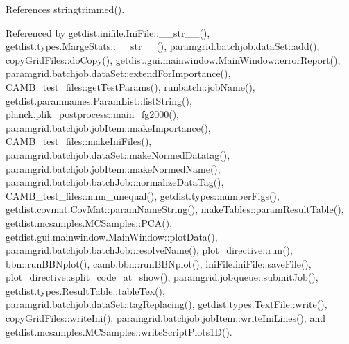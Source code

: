 References stringtrimmed().



Referenced by getdist.\+inifile.\+Ini\+File\+::\+\_\+\+\_\+str\+\_\+\+\_\+(), getdist.\+types.\+Marge\+Stats\+::\+\_\+\+\_\+str\+\_\+\+\_\+(), paramgrid.\+batchjob.\+data\+Set\+::add(), copy\+Grid\+Files\+::do\+Copy(), getdist.\+gui.\+mainwindow.\+Main\+Window\+::error\+Report(), paramgrid.\+batchjob.\+data\+Set\+::extend\+For\+Importance(), C\+A\+M\+B\+\_\+test\+\_\+files\+::get\+Test\+Params(), runbatch\+::job\+Name(), getdist.\+paramnames.\+Param\+List\+::list\+String(), planck.\+plik\+\_\+postprocess\+::main\+\_\+fg2000(), paramgrid.\+batchjob.\+job\+Item\+::make\+Importance(), C\+A\+M\+B\+\_\+test\+\_\+files\+::make\+Ini\+Files(), paramgrid.\+batchjob.\+data\+Set\+::make\+Normed\+Datatag(), paramgrid.\+batchjob.\+job\+Item\+::make\+Normed\+Name(), paramgrid.\+batchjob.\+batch\+Job\+::normalize\+Data\+Tag(), C\+A\+M\+B\+\_\+test\+\_\+files\+::num\+\_\+unequal(), getdist.\+types\+::number\+Figs(), getdist.\+covmat.\+Cov\+Mat\+::param\+Name\+String(), make\+Tables\+::param\+Result\+Table(), getdist.\+mcsamples.\+M\+C\+Samples\+::\+P\+C\+A(), getdist.\+gui.\+mainwindow.\+Main\+Window\+::plot\+Data(), paramgrid.\+batchjob.\+batch\+Job\+::resolve\+Name(), plot\+\_\+directive\+::run(), bbn\+::run\+B\+B\+Nplot(), camb.\+bbn\+::run\+B\+B\+Nplot(), ini\+File.\+ini\+File\+::save\+File(), plot\+\_\+directive\+::split\+\_\+code\+\_\+at\+\_\+show(), paramgrid.\+jobqueue\+::submit\+Job(), getdist.\+types.\+Result\+Table\+::table\+Tex(), paramgrid.\+batchjob.\+data\+Set\+::tag\+Replacing(), getdist.\+types.\+Text\+File\+::write(), copy\+Grid\+Files\+::write\+Ini(), paramgrid.\+batchjob.\+job\+Item\+::write\+Ini\+Lines(), and getdist.\+mcsamples.\+M\+C\+Samples\+::write\+Script\+Plots1\+D().

